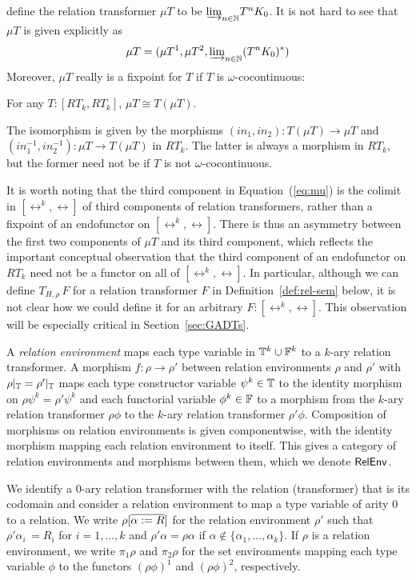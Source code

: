 \documentclass{lmcs}
\theoremstyle{plain}\newtheorem{satz}[thm]{Satz}
\begin{document}
define the relation transformer $\mu T$ to be ${{\underrightarrow{\lim}}_{n \in \mathbb{N}}{T^n
  K_0}}$. It is not hard to see that $\mu T$ is given explicitly as
\begin{equation}\label{eq:mu}
\mu T = (\mu T^1,\mu T^2, {{\underrightarrow{\lim}}_{n \in \mathbb{N}}{(T^nK_0)^*}})
\end{equation}
Moreover, $\mu T$ really is a fixpoint for $T$ if $T$ is
$\omega$-cocontinuous:
\begin{lem}\label{lem:fp}
For any $T : [RT_k,RT_k]$, $\mu T \cong T(\mu T)$.
\end{lem}
\noindent
The isomorphism is given by the morphisms $(\mathit{in}_1,
\mathit{in}_2) : T(\mu T) \to \mu T$ and $(in_1^{-1}, in_2^{-1}) : \mu
T \to T(\mu T)$ in $RT_k$. The latter is always a morphism in $RT_k$,
but the former need not be if $T$ is not $\omega$-cocontinuous.

It is worth noting that the third component in Equation~(\ref{eq:mu})
is the colimit in $[\rel^k,\rel]$ of third components of relation
transformers, rather than a fixpoint of an endofunctor on
$[\rel^k,\rel]$. There is thus an asymmetry between the first two
components of $\mu T$ and its third component, which reflects the
important conceptual observation that the third component of an
endofunctor on $RT_k$ need not be a functor on all of
$[\rel^k,\rel]$. In particular, although we can define $T_{H,\rho}\,
F$ for a relation transformer $F$ in Definition~\ref{def:rel-sem}
below, it is not clear how we could define it for an arbitrary $F :
[\rel^k,\rel]$. This observation will be especially critical in
Section~\ref{sec:GADTs}.

\begin{defi}\label{def:reln-env}
A {\em relation environment} maps each type variable in $\mathbb{T}^k \cup
\mathbb{F}^k$ to a $k$-ary relation transformer.  A morphism $f : \rho \to
\rho'$ between relation environments $\rho$ and $\rho'$ with
$\rho|_{\mathbb{T}} = \rho'|_{\mathbb{T}}$ maps each type constructor variable
$\psi^k \in \mathbb{T}$ to the identity morphism on $\rho \psi^k = \rho'
\psi^k$ and each functorial variable $\phi^k \in \mathbb{F}$ to a morphism
from the $k$-ary relation transformer $\rho \phi$ to the $k$-ary
relation transformer $\rho' \phi$. Composition of morphisms on
relation environments is given componentwise, with the identity
morphism mapping each relation environment to itself. This gives a
category of relation environments and morphisms between them, which we
denote $\mathsf{RelEnv}$.
\end{defi}
We identify a $0$-ary relation transformer with the relation
(transformer) that is its codomain and consider a relation environment
to map a type variable of arity $0$ to a relation.  We write
$\rho[\overline{\alpha := R}]$ for the relation environment $\rho'$ such
that $\rho' \alpha_i \, = R_i$ for $i = 1,...,k$ and $\rho' \alpha =
\rho\alpha$ if $\alpha \not \in \{\alpha_1,...,\alpha_k\}$.  If $\rho$
is a relation environment, we write $\pi_1 \rho$ and $\pi_2 \rho$ for
the set environments mapping each type variable $\phi$ to the functors
$(\rho\phi)^1$ and $(\rho\phi)^2$, respectively.
\end{document}

